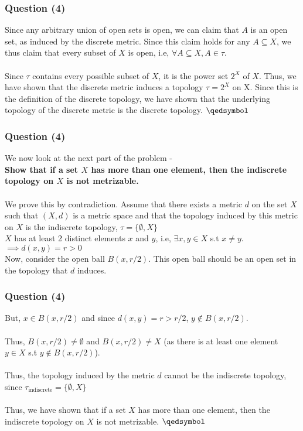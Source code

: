 \begin{frame}
    \frametitle{Question (4)}
    Since any arbitrary union of open sets is open, we can claim that $A$ is an open set, as induced by the discrete metric. Since this claim holds for any $A \subseteq X$, we thus claim that every subset of $X$ is open, i.e, $\forall A \subseteq X, A \in \tau$.\\\\
    Since $\tau$ contains every possible subset of $X$, it is the power set $2^X$ of $X$. Thus, we have shown that the discrete metric induces a topology $\tau = 2^X$ on X. Since this is the definition of the discrete topology, we have shown that the underlying topology of the discrete metric is the discrete topology. $\qedsymbol$
\end{frame}

\begin{frame}
    \frametitle{Question (4)}
    We now look at the next part of the problem - \\
    \textbf{Show that if a set $X$ has more than one element, then the indiscrete topology on $X$ is not metrizable.}\\\\
    We prove this by contradiction. Assume that there exists a metric $d$ on the set $X$ such that $(X,d)$ is a metric space and that the topology induced by this metric on $X$ is the indiscrete topology, $\tau = \{ \emptyset , X \}$\\
    $X$ has at least 2 distinct elements $x$ and $y$, i.e, $\exists x,y \in X$ s.t $x \neq y$. \\
    $\implies d(x,y) = r > 0$ \\
    Now, consider the open ball $B(x,r/2)$. This open ball should be an open set in the topology that $d$ induces.
\end{frame}

\begin{frame}
    \frametitle{Question (4)}
    But, $x \in B(x,r/2)$ and since $d(x,y) = r > r/2$, $y \notin B(x,r/2)$. \\\\
    Thus, $B(x,r/2) \neq \emptyset$ and $B(x,r/2) \neq X$ (as there is at least one element $y \in X$ s.t $y \notin B(x,r/2)$).\\\\
    Thus, the topology induced by the metric $d$ cannot be the indiscrete topology, since $\tau_{\text{indiscrete}} = \{\emptyset, X\}$\\\\
    Thus, we have shown that if a set $X$ has more than one element, then the indiscrete topology on $X$ is not metrizable. $\qedsymbol$
\end{frame}
